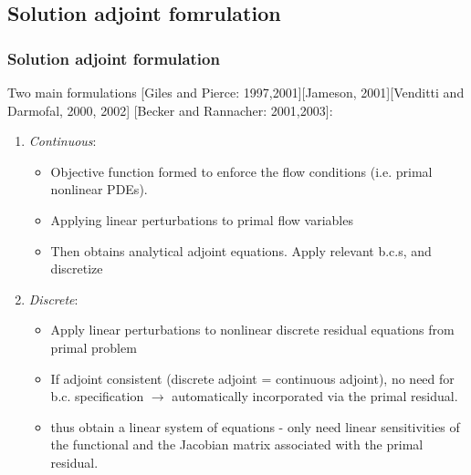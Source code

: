 \documentclass{beamer}
\begin{document}

\subsection[Adjoint formulation]{Solution adjoint fomrulation}
\begin{frame}%
\frametitle{Solution adjoint formulation}
Two main formulations
\newline \tiny{[Giles and Pierce: 1997,2001][Jameson, 2001][Venditti and Darmofal, 2000, 2002] [Becker and Rannacher: 2001,2003]}:
\begin{enumerate}[1.]
\item \scriptsize{\textit{Continuous}}:
\begin{itemize} 
\scriptsize
\item Objective function formed to enforce the flow conditions (i.e. primal nonlinear PDEs). 
\item Applying linear perturbations to primal flow variables
\item Then obtains analytical adjoint equations. Apply relevant b.c.s, and discretize
\end{itemize}
\item \scriptsize{\textit{Discrete}}: 
\begin{itemize}
\scriptsize
\item Apply linear perturbations to nonlinear discrete residual equations from primal problem
\item If adjoint consistent (discrete adjoint = continuous adjoint), no need for b.c. specification $\rightarrow$ automatically incorporated via the primal residual.   
\item thus obtain a linear system of equations - only need linear sensitivities of the functional and the Jacobian matrix associated with the primal residual.
\end{itemize}
\end{enumerate}
\end{frame}

\end{document}
